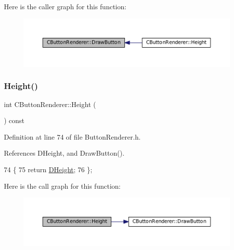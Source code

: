 Here is the caller graph for this function\+:\nopagebreak
\begin{figure}[H]
\begin{center}
\leavevmode
\includegraphics[width=350pt]{classCButtonRenderer_a9f29dd6d2243ddae58211706cc6b37b6_icgraph}
\end{center}
\end{figure}
\hypertarget{classCButtonRenderer_aecdea7c8978a3d0fb27f3a7bf49d8387}{}\label{classCButtonRenderer_aecdea7c8978a3d0fb27f3a7bf49d8387} 
\subsubsection{\texorpdfstring{Height()}{Height()}\hspace{0.1cm}{\footnotesize\ttfamily [1/2]}}
{\footnotesize\ttfamily int C\+Button\+Renderer\+::\+Height (\begin{DoxyParamCaption}{ }\end{DoxyParamCaption}) const\hspace{0.3cm}{\ttfamily [inline]}}



Definition at line 74 of file Button\+Renderer.\+h.



References D\+Height, and Draw\+Button().


\begin{DoxyCode}
74                           \{
75             \textcolor{keywordflow}{return} \hyperlink{classCButtonRenderer_a7e3d605b90c45d87ac1396c23c90b250}{DHeight};    
76         \};
\end{DoxyCode}
Here is the call graph for this function\+:\nopagebreak
\begin{figure}[H]
\begin{center}
\leavevmode
\includegraphics[width=350pt]{classCButtonRenderer_aecdea7c8978a3d0fb27f3a7bf49d8387_cgraph}
\end{center}
\end{figure}
\hypertarget{classCButtonRenderer_addba56a5d490f33010c919020e67a376}{}\label{classCButtonRenderer_addba56a5d490f33010c919020e67a376} 
